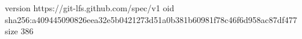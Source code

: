 version https://git-lfs.github.com/spec/v1
oid sha256:a409445090826eea32e5b0421273d51a0b381b60981f78c46f6d958ac87df477
size 386
